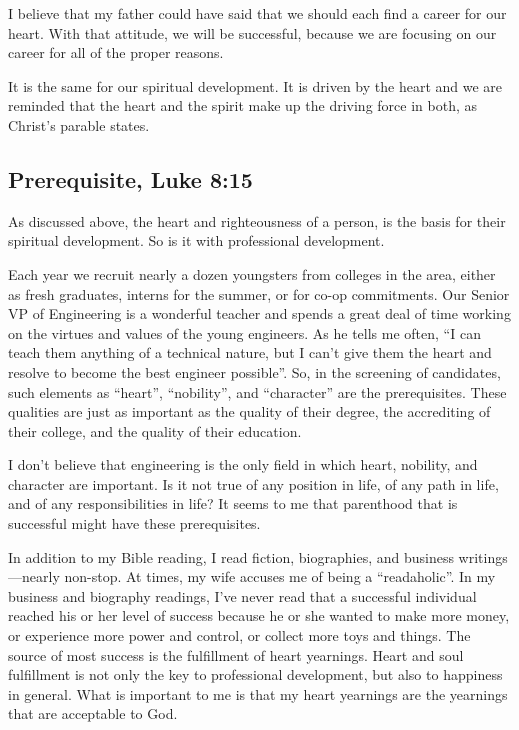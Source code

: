 \documentclass[12pt]{memoir}
\begin{document}
I believe that my father could have said that we should each find a career for our heart. With that attitude, we will be successful, because we are focusing on our career for all of the proper reasons.

It is the same for our spiritual development. It is driven by
the heart and we are reminded that the heart and the spirit make up the driving force in both, as Christ's parable states.

\subsection[Prerequisite]{Prerequisite, Luke 8:15}

As discussed above, the heart and righteousness of a person, is the basis for their spiritual development. So is it with professional development.

Each year we recruit nearly a dozen youngsters from colleges in the area, either as fresh graduates, interns for the summer, or for co-op commitments. Our Senior VP of Engineering is a wonderful teacher and spends a great deal of time working on the virtues and values of the
young engineers. As he tells me often, ``I can teach them anything of a technical nature, but I can't give them the heart and resolve to become the best engineer possible''. So, in the screening of candidates, such elements as ``heart'', ``nobility'', and ``character'' are the prerequisites. These qualities are just as important as the quality of their degree, the accrediting of their college, and the quality of their education. 

I don't believe that engineering is the only field in which heart,
nobility, and character are important. Is it not true of any position
in life, of any path in life, and of any responsibilities in life?
It seems to me that parenthood that is successful might have these prerequisites.

In addition to my Bible reading, I read fiction, biographies, and business writings---nearly non-stop. At times, my wife accuses me of being a ``readaholic''. In my business and biography readings, I've never read that a successful individual reached his or her level of success because he or she wanted to make more money, or experience more power and control, or collect more toys and things.
The source of most success is the fulfillment of heart yearnings.
Heart and soul fulfillment is not only the key to professional development, but also to happiness in general. What is important to me is that
my heart yearnings are the yearnings that are acceptable to God.
\end{document}
